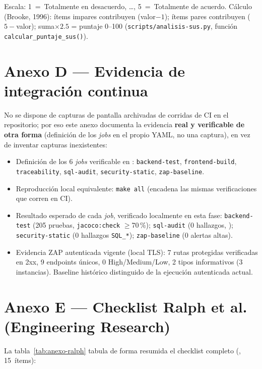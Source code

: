Escala: 1~=~Totalmente en desacuerdo, \ldots, 5~=~Totalmente de acuerdo.
C\'alculo (Brooke, 1996): \'items impares contribuyen (valor$-1$); \'items
pares contribuyen ($5-$valor); suma$\times 2.5$ = puntaje 0--100
(\texttt{scripts/analisis-sus.py}, funci\'on \texttt{calcular\_puntaje\_sus()}).

\section{Anexo D --- Evidencia de integraci\'on continua}
\label{sec:anexo-ci}

No se dispone de capturas de pantalla archivadas de corridas de CI en el
repositorio; por eso este anexo documenta la evidencia \textbf{real y
verificable de otra forma} (definici\'on de los \emph{jobs} en el propio
YAML, no una captura), en vez de inventar capturas inexistentes:

\begin{itemize}[nosep]
  \item Definici\'on de los 6 \emph{jobs} verificable en
    : \texttt{backend-test},
    \texttt{frontend-build}, \texttt{traceability}, \texttt{sql-audit},
    \texttt{security-static}, \texttt{zap-baseline}.
  \item Reproducci\'on local equivalente: \texttt{make all} (encadena las
    mismas verificaciones que corren en CI).
  \item Resultado esperado de cada \emph{job}, verificado localmente en
    esta fase: \texttt{backend-test} (205 pruebas,
    \texttt{jacoco:\allowbreak check}
    $\geq$70\,\%); \texttt{sql-audit} (0 hallazgos,
    ); \texttt{security-static}
    (0 hallazgos \texttt{SQL\_*}); \texttt{zap-baseline} (0 alertas altas).
  \item Evidencia ZAP autenticada vigente (local TLS): 7 rutas protegidas
    verificadas en 2xx, 9 endpoints \'unicos, 0 High/Medium/Low, 2 tipos
    informativos (3 instancias). Baseline hist\'orico distinguido de la
    ejecuci\'on autenticada actual.
\end{itemize}

\section{Anexo E --- Checklist Ralph et al. (Engineering Research)}
\label{sec:anexo-ralph}

La tabla~\ref{tab:anexo-ralph} tabula de forma resumida el checklist
completo (,
15~\'items):

